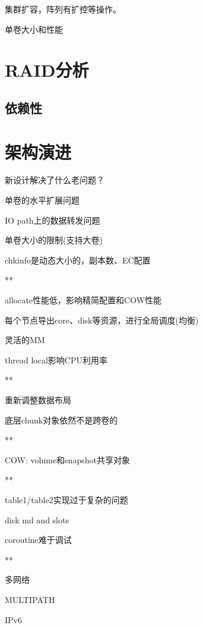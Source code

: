 集群扩容，阵列有扩控等操作。

单卷大小和性能

\section{RAID分析}



\subsection{依赖性}



\section{架构演进}

新设计解决了什么老问题？
\begin{enumbox}
\item 单卷的水平扩展问题
\item IO path上的数据转发问题
\item 单卷大小的限制(支持大卷)
\item chkinfo是动态大小的，副本数、EC配置
\item ***
\item allocate性能低，影响精简配置和COW性能
\item 每个节点导出core、disk等资源，进行全局调度(均衡)
\item 灵活的MM
\item thread local影响CPU利用率
\item ***
\item 重新调整数据布局
\item 底层chunk对象依然不是跨卷的
\item ***
\item COW: volume和snapshot共享对象
\item ***
\item table1/table2实现过于复杂的问题
\item disk md and slots
\item coroutine难于调试
\item ***
\item 多网络
\item MULTIPATH
\item IPv6
\end{enumbox}

